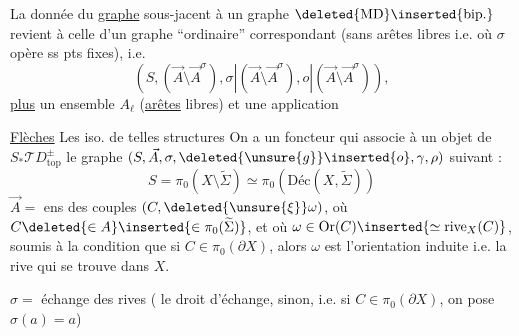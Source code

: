 
La donnée du \uline{graphe} sous-jacent à un graphe
$\deleted{\mathrm{MD}}\inserted{\mathrm{bip.}}$ revient à celle d'un graphe
``ordinaire'' correspondant (sans arêtes libres i.e. où $\sigma$ opère
ss pts fixes), i.e.
\[
\left(S,(\vec A\setminus\vec A^\sigma),
 \sigma|(\vec A\setminus\vec A^\sigma),
 o|(\vec A\setminus\vec A^\sigma)\right),
\]
\uline{plus} un ensemble  $A_\ell$
(\uline{arêtes} libres)
 et une application

\uline{Flèches} Les iso. de telles structures
On a un foncteur
qui associe à un objet  de
$S_*\mathcal TD^\pm_{\mathrm{top}}$ le graphe 
$(S,\vec A,\sigma,\deleted{\unsure{g}}\inserted{o},\gamma,\rho)$ suivant :
\[
S=\pi_0(X\setminus\widetilde\Sigma)\simeq\pi_0(\text{Déc}(X,\widetilde\Sigma))
\]
$\vec A=$ ens des couples $(C,\deleted{\unsure{\xi}}\omega)$, où
$C\deleted{\in A}\inserted{\in\pi_0(\widetilde\Sigma)}$, et où
$\omega\in\mathrm{Or}(C)\inserted{\simeq\mathrm{rive}_X(C)}$,
soumis à la condition que si $C\in\pi_0(\partial X)$, alors $\omega$
est l'orientation induite i.e. la rive qui se trouve dans $X$.

$\sigma=$ échange des rives ( le droit d'échange,
sinon, i.e. si $C\in\pi_0(\partial X)$, on pose $\sigma(a)=a$)

